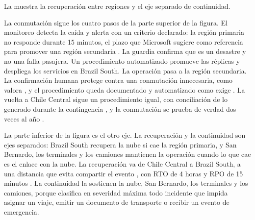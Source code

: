 La  muestra la recuperación entre regiones y el eje separado de continuidad.


La conmutación sigue los cuatro pasos de la parte superior de la figura. El monitoreo detecta la caída y
alerta con un criterio declarado: la región primaria no responde durante 15 minutos, el plazo que
Microsoft sugiere como referencia para promover una región secundaria \parencite{ms_eh_georep}. La guardia
confirma que es un desastre y no una falla pasajera. Un procedimiento automatizado promueve las
réplicas y despliega los servicios en Brazil South. La operación pasa a la región secundaria. La
confirmación humana protege contra una conmutación innecesaria, como valora , y el
procedimiento queda documentado y automatizado como exige . La vuelta a Chile
Central sigue un procedimiento igual, con conciliación de lo generado durante la contingencia
, y la conmutación se prueba de verdad dos veces al año
.


La parte inferior de la figura es el otro eje. La recuperación y la continuidad son ejes separados:
Brazil South recupera la nube si cae la región primaria, y San Bernardo, los terminales y los camiones
mantienen la operación cuando lo que cae es el enlace con la nube. La recuperación va de Chile Central a Brazil South, a una distancia que evita
compartir el evento , con RTO de 4 horas y RPO de 15 minutos
. La continuidad la sostienen la nube, San Bernardo, los terminales y los
camiones, porque  clasifica en severidad máxima todo incidente que impida asignar un
viaje, emitir un documento de transporte o recibir un evento de emergencia.

